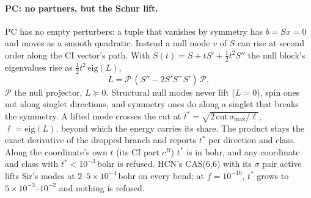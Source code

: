 \documentclass[11pt]{article}
\begin{document}
\paragraph{PC: no partners, but the Schur lift.} PC has no empty perturbers:
a tuple that vanishes by symmetry has $b = Sx = 0$ and moves as a smooth
quadratic. Instead a null mode $v$ of $S$ can rise at second order along
the CI vector's path. With $S(t) = S + tS' + \tfrac12t^2S''$ the null block's
eigenvalues rise as $\tfrac12t^2\,\mathrm{eig}(L)$,
\begin{equation}
  L = \mathcal P\,(S'' - 2S'S^+S')\,\mathcal P,
\end{equation}
$\mathcal P$ the null projector, $L \succeq 0$. Structural null modes never
lift ($L = 0$), spin ones not along singlet directions, and symmetry ones
do along a singlet that breaks the symmetry. A lifted mode crosses the cut
at $t^* = \sqrt{2\,\mathrm{cut}\,\sigma_{\max}/\ell}$, $\ell = \mathrm{eig}(L)$,
beyond which the energy carries its share. The product stays the exact
derivative of the dropped branch and reports $t^*$ per direction and class.
Along the coordinate's own $t$ (its CI part $c^B$) $t^*$ is in bohr, and any
coordinate and class with $t^* < 10^{-3}$\,bohr is refused. HCN's CAS(6,6)
with its $\sigma$ pair active lifts Sir's modes at $2$--$5\times10^{-4}$\,bohr
on every bend; at $f = 10^{-10}$, $t^*$ grows to $5\times10^{-3}$--$10^{-2}$
and nothing is refused.
\end{document}

